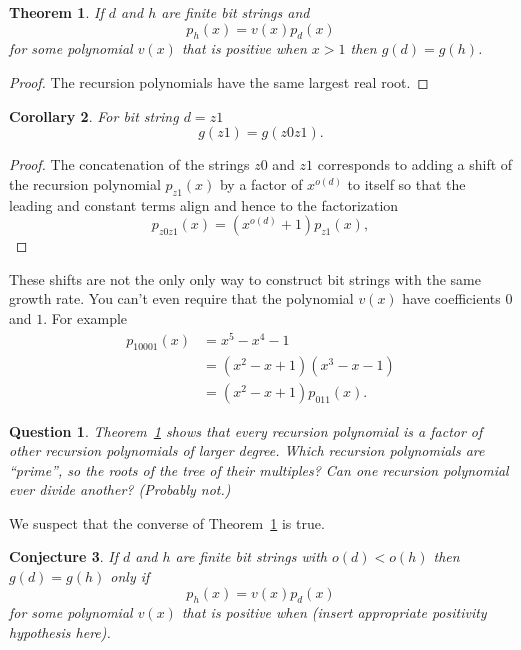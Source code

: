 \documentclass[10pt]{article}
\newtheorem{theorem}{Theorem}
\newtheorem{conjecture}[theorem]{Conjecture}
\newtheorem{corollary}[theorem]{Corollary}
\newtheorem{question}{Question}
\numberwithin{equation}{section}
\begin{document}
\begin{theorem}\label{thm:shift}
If $d$ and $h$ are finite bit strings and
    \begin{equation*}
p_h(x) = v(x)p_d(x)
    \end{equation*}
    for some polynomial $v(x)$ that is positive when $x > 1$
    then     $g(d) = g(h)$.
\end{theorem}
\begin{proof}
 The recursion polynomials have the same largest
    real root.
\end{proof}

\begin{corollary}
  For bit string $d = z1$ 
  \begin{equation*}
  g(z1) = g(z0z1).
  \end{equation*}
\end{corollary}
  \begin{proof}
The concatenation of the strings $z0$ and $z1$ corresponds to adding a
shift  of the recursion polynomial $p_{z1}(x)$ by a factor of
$x^{o(d)}$ to itself so that the
leading and constant terms align and hence to
  the factorization
  \begin{equation*}
p_{z0z1}(x) = (x^{o(d)} + 1)p_{z1}(x) ,
  \end{equation*}
  \end{proof}

  These shifts are not the only only way to construct bit strings with
  the same growth rate. You can't even require that the polynomial
  $v(x)$ have coefficients $0$ and $1$. For example
\begin{align*}
  p_{10001}(x) &= x^5 - x^4 - 1 \\
  &= (x^2 -x + 1)(x^3 - x - 1) \\
  &= (x^2 -x + 1)p_{011}(x).
\end{align*}

\begin{question}
Theorem~\ref{thm:shift} shows that every recursion polynomial is a
factor of other recursion polynomials of larger degree. Which
recursion polynomials are ``prime'', so the roots of the tree of their
multiples? Can one recursion polynomial ever divide another? (Probably
not.)
\end{question}

We suspect that the converse of Theorem~\ref{thm:shift}
is true.
  \begin{conjecture} If $d$ and $h$ are finite bit strings with $o(d)< o(h)$
    then $g(d) = g(h)$ only if 
    \begin{equation*}
p_h(x) = v(x)p_d(x)
    \end{equation*}
    for some polynomial $v(x)$ that is positive when (insert
    appropriate positivity hypothesis here).
  \end{conjecture}
\end{document}
